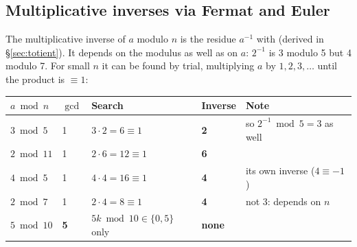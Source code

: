 \subsection{Multiplicative inverses via Fermat and Euler \hot}
The multiplicative inverse of $a$ modulo $n$ is the residue $a^{-1}$ with  (derived in \S\ref{sec:totient}). It depends on the modulus as well as on $a$: $2^{-1}$ is 3 modulo 5 but 4 modulo 7. For small $n$ it can be found by trial, multiplying $a$ by $1, 2, 3, \dots$ until the product is $\equiv 1$:
\begin{center}\small
\begin{tabular}{@{}lllll@{}}
\toprule
$a \bmod n$ & $\gcd$ & Search & Inverse & Note\\
\midrule
$3 \bmod 5$ & 1 & $3\cdot2 = 6 \equiv 1$ & \textbf{2} & so $2^{-1} \bmod 5 = 3$ as well\\
$2 \bmod 11$ & 1 & $2\cdot6 = 12 \equiv 1$ & \textbf{6} & \\
$4 \bmod 5$ & 1 & $4\cdot4 = 16 \equiv 1$ & \textbf{4} & its own inverse ($4 \equiv -1$)\\
$2 \bmod 7$ & 1 & $2\cdot4 = 8 \equiv 1$ & \textbf{4} & not 3: depends on $n$\\
$5 \bmod 10$ & \textbf{5} & $5k \bmod 10 \in \{0, 5\}$ only & \textbf{none} & \\
\bottomrule
\end{tabular}
\end{center}

